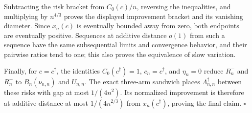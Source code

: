 Subtracting the risk bracket from \(C_0(c)/n\), reversing the inequalities, and multiplying by \(n^{4/3}\) proves the displayed improvement bracket and its vanishing diameter.  Since \(x_n(c)\) is eventually bounded away from zero, both endpoints are eventually positive.  Sequences at additive distance \(o(1)\) from such a sequence have the same subsequential limits and convergence behavior, and their pairwise ratios tend to one; this also proves the equivalence of slow variation.

Finally, for \(c=c^\dagger\), the identities \(C_0(c^\dagger)=1\), \(c_n=c^\dagger\), and \(\eta_n=0\) reduce \(R_n^-\) and \(R_n^+\) to \(B_n(\nu_{n,n})\) and \(U_{n,n}\).  The exact three-arm sandwich places \(\Lambda_{n,n}^\dagger\) between these risks with gap at most \(1/(4n^2)\).  Its normalized improvement is therefore at additive distance at most \(1/(4n^{2/3})\) from \(x_n(c^\dagger)\), proving the final claim. \(\square\)